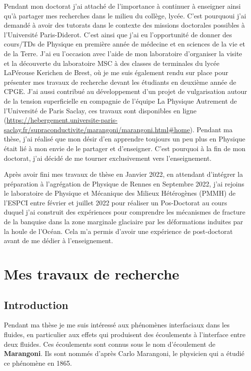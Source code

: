 \documentclass[french, 10pt]{article}
\begin{document}
Pendant mon doctorat j'ai attaché de l'importance à continuer à enseigner ainsi qu'à partager mes recherches dans le milieu du collège, lycée. C'est pourquoui j'ai demandé à avoir des tutorats dans le contexte des missions doctorales possibles à l'Université Paris-Diderot. C'est ainsi que j'ai eu l'opportunité de donner des cours/TDs de Physique en première année de médecine et en sciences de la vie et de la Terre. J'ai eu l'occasion avec l'aide de mon laboratoire d'organiser la visite et la découverte du laboratoire MSC à des classes de terminales du lycée LaPérouse Kerichen de Brest, où je me suis également rendu sur place pour présenter mes travaux de recherche devant les étudiants en deuxième année de CPGE. J'ai aussi contribué au développement d'un projet de vulgarisation autour de la tension superficielle en compagnie de l'équipe \og{}La Physique Autrement\fg{} de l'Université de Paris Saclay, ces travaux sont disponibles en ligne (\url{https://hebergement.universite-paris-saclay.fr/supraconductivite/marangoni/marangoni.html#home}). Pendant ma thèse, j'ai réalisé que mon désir d'en apprendre toujours un peu plus en Physique était lié à mon envie de le partager et d'enseigner. C'est pourquoi à la fin de mon doctorat, j'ai décidé de me tourner exclusivement vers l'enseignement.\medskip

Après avoir fini mes travaux de thèse en Janvier 2022, en attendant d'intégrer la préparation à l'agrégation de Physique de Rennes en Septembre 2022, j'ai rejoins le laboratoire de Physique et Mécanique des Milieux Hétérogènes (PMMH) de l'ESPCI entre février et juillet 2022 pour réaliser un Pos-Doctorat au cours duquel j'ai construit des expériences pour comprendre les mécanismes de fracture de la banquise dans la zone marginale glaciaire par les déformations induites par la houle de l'Océan. Cela m'a permis d'avoir une expérience de post-doctorat avant de me dédier à l'enseignement.

\section{Mes travaux de recherche}
% 
\subsection{Introduction}

Pendant ma thèse je me suis intéressé aux phénomènes interfaciaux dans les fluides, en particulier aux effets qui produisent des écoulements à l'interface entre deux fluides. Ces écoulements sont connus sous le nom d’écoulement de \textbf{Marangoni}. Ils sont nommés d’après Carlo Marangoni, le physicien qui a étudié ce phénomène en 1865.\medskip
\end{document}
